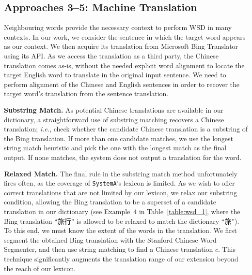 \begin{CJK}{UTF8}{gbsn}
\subsection{Approaches 3--5: Machine Translation}

Neighbouring words provide the necessary context to perform WSD in
many contexts. In our work, we consider the sentence in which the
target word appears as our context. We then acquire its translation
from Microsoft Bing
Translator using its
API.  As we access the translation as a third party, the Chinese
translation comes as-is, without the needed explicit word alignment to
locate the target English word to translate in the original input
sentence. We need to perform alignment of the Chinese and English
sentences in order to recover the target word's translation from the
sentence translation.

{\bf Substring Match.} As potential Chinese translations are
available in our dictionary, a straightforward use of substring
matching recovers a Chinese translation; {\it i.e.}, check whether the
candidate Chinese translation is a substring of the Bing
translation. If more than one candidate matches, we use the longest
string match heuristic and pick the one with the longest match as the
final output. If none matches, the system does not output a translation
for the word.  

{\bf Relaxed Match.} The final rule in the substring match method
unfortunately fires often, as the coverage of {\tt SystemA}'s lexicon
is limited.  As we wish to offer correct translations that are not
limited by our lexicon, we relax our substring condition, allowing the
Bing translation to be a superset of a candidate translation in our
dictionary (see Example~4 in Table~\ref{table:wsd_1}, where the Bing
translation ``旅行'' is allowed to be relaxed to match the dictionary
``旅'').
To this end, we must know the extent of the words in the translation.
We first segment the obtained Bing translation with the Stanford
Chinese Word Segmenter, and then use string matching to find a Chinese
translation $c$.  This technique significantly augments the
translation range of our extension beyond the reach of our lexicon.




\end{CJK}

